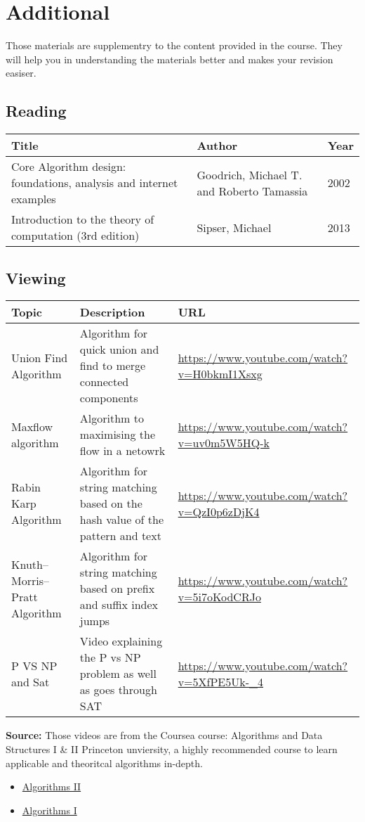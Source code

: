 \section*{Additional}
Those materials are supplementry to the content provided in the course. 
They will help you in understanding the materials better and makes your revision easiser. 
\subsection*{Reading}
\begin{tabularx}{\textwidth} {|X|X|l|}
  \hline
  
  Title & Author & Year\\ \hline
    Core Algorithm design: foundations, analysis and internet examples &
    Goodrich, Michael T. and Roberto Tamassia &
    2002 \\ \hline
    Introduction to the theory of computation (3rd edition) &
    Sipser, Michael&
    2013\\ \hline
\end{tabularx}

\subsection*{Viewing}
\begin{tabularx}{\textwidth} {|X|X|l|}
  \hline
    Topic & Description & URL \\ \hline
    Union Find Algorithm &
    Algorithm for quick union and find to merge connected components &
    \url{https://www.youtube.com/watch?v=H0bkmI1Xsxg} \\ \hline
    Maxflow algorithm &
    Algorithm to maximising the flow in a netowrk &
    \url{https://www.youtube.com/watch?v=uv0m5W5HQ-k}\\ \hline
    Rabin Karp Algorithm &
    Algorithm for string matching based on the hash value of the pattern and text &
    \url{https://www.youtube.com/watch?v=QzI0p6zDjK4} \\ \hline
    Knuth–Morris–Pratt Algorithm &
    Algorithm for string matching based on prefix and suffix index jumps &
    \url{https://www.youtube.com/watch?v=5i7oKodCRJo} \\ \hline
    P VS NP and Sat &
    Video explaining the P vs NP problem as well as goes through SAT &
    \url{https://www.youtube.com/watch?v=5XfPE5Uk-_4} \\ \hline
    \end{tabularx}
\textbf{Source: } Those videos are from the Coursea course: 
Algorithms and Data Structures I \& II Princeton unviersity, 
a highly recommended course to learn applicable and theoritcal algorithms in-depth.
\begin{itemize}
  \item \href{https://www.coursera.org/learn/algorithms-part2/}{Algorithms II}
  \item \href{https://www.coursera.org/learn/algorithms-part1/} {Algorithms I}
\end{itemize}
